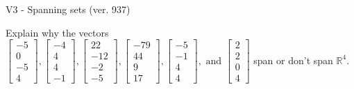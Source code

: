 \begin{exercise}
  \begin{exerciseTitle}V3 - Spanning sets (ver. 937)\end{exerciseTitle}
  \begin{exerciseStatement}
    Explain why the vectors \(\left[\begin{array}{r}
-5 \\
0 \\
-5 \\
4
\end{array}\right] , \left[\begin{array}{r}
-4 \\
4 \\
4 \\
-1
\end{array}\right] , \left[\begin{array}{r}
22 \\
-12 \\
-2 \\
-5
\end{array}\right] , \left[\begin{array}{r}
-79 \\
44 \\
9 \\
17
\end{array}\right] , \left[\begin{array}{r}
-5 \\
-1 \\
4 \\
4
\end{array}\right] , \text{ and } \left[\begin{array}{r}
2 \\
2 \\
0 \\
4
\end{array}\right]\) span or don't span \(\mathbb{R}^4\). 
	



\end{exerciseStatement}
\end{exercise}

